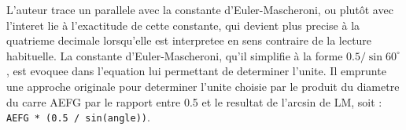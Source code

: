 \documentclass[12pt,a4paper]{article}
\begin{document}
L'auteur trace un parallele avec la constante d'Euler-Mascheroni, 
ou plutôt avec l'interet lie à l'exactitude de cette constante, 
qui devient plus precise à la quatrieme decimale lorsqu'elle est interpretee 
en sens contraire de la lecture habituelle. 
La constante d'Euler-Mascheroni, qu'il simplifie à la forme 
\(0.5 / \sin 60^\circ\), est evoquee dans l'equation lui permettant 
de determiner l'unite. Il emprunte une approche originale pour determiner 
l'unite choisie par le produit du diametre du carre AEFG 
par le rapport entre 0.5 et le resultat de l'arcsin de LM, 
soit : \texttt{AEFG * (0.5 / sin(angle))}.

\vspace{0.8cm}

\end{document}
